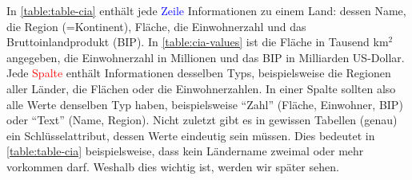 \begin{table}[H]
  \centering
  \tiny
  \caption{Typische Tabellenstruktur anhand einer Tabelle mit Informationen zu Ländern}
  \label{table:table-cia}
\end{table}
In \cref{table:table-cia} enthält jede \textcolor{blue}{Zeile} Informationen zu einem Land: dessen Name, die Region (=Kontinent), Fläche, die Einwohnerzahl und das Bruttoinlandprodukt (BIP). In \cref{table:cia-values} ist die Fläche in Tausend km$^2$ angegeben, die Einwohnerzahl in Millionen und das BIP in Milliarden US-Dollar.
Jede \textcolor{red}{Spalte} enthält Informationen desselben Typs, beispielsweise die Regionen aller Länder, die Flächen oder die Einwohnerzahlen.
In einer Spalte sollten also alle Werte denselben Typ haben, beispielsweise \enquote{Zahl} (Fläche, Einwohner, BIP) oder
\enquote{Text} (Name, Region).
Nicht zuletzt gibt es in gewissen Tabellen (genau) ein Schlüsselattribut, dessen Werte eindeutig sein müssen.
Dies bedeutet in \cref{table:table-cia} beispielsweise, dass kein Ländername zweimal oder mehr vorkommen darf. Weshalb dies wichtig ist, werden wir später sehen.

